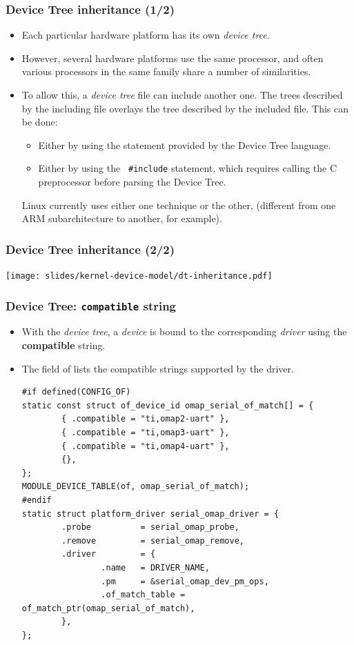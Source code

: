 \begin{frame}
  \frametitle{Device Tree inheritance (1/2)}
  \begin{itemize}
  \item Each particular hardware platform has its own {\em device tree}.
  \item However, several hardware platforms use the same processor,
    and often various processors in the same family share a number of
    similarities.
  \item To allow this, a {\em device tree} file can include another
    one. The trees described by the including file overlays the tree
    described by the included file. This can be done:
    \begin{itemize}
       \item Either by using the  statement
         provided by the Device Tree language.
       \item Either by using the {\tt
         \#include} statement, which requires calling the C
         preprocessor before parsing the Device Tree.
    \end{itemize}
    Linux currently uses either one technique or the other,
    (different from one ARM subarchitecture to another, for example).
  \end{itemize}
\end{frame}

\begin{frame}
  \frametitle{Device Tree inheritance (2/2)}
  \begin{center}
    \texttt{[image: slides/kernel-device-model/dt-inheritance.pdf]}
  \end{center}
\end{frame}

\begin{frame}[fragile]
  \frametitle{Device Tree: {\tt compatible} string}
  \begin{itemize}
  \item With the {\em device tree}, a {\em device} is bound to the
    corresponding {\em driver} using the {\bf compatible} string.
  \item The  field of 
    lists the compatible strings supported by the driver.
    \begin{block}{}
  \begin{verbatim}
#if defined(CONFIG_OF)
static const struct of_device_id omap_serial_of_match[] = {
        { .compatible = "ti,omap2-uart" },
        { .compatible = "ti,omap3-uart" },
        { .compatible = "ti,omap4-uart" },
        {},
};
MODULE_DEVICE_TABLE(of, omap_serial_of_match);
#endif
static struct platform_driver serial_omap_driver = {
        .probe          = serial_omap_probe,
        .remove         = serial_omap_remove,
        .driver         = {
                .name   = DRIVER_NAME,
                .pm     = &serial_omap_dev_pm_ops,
                .of_match_table = of_match_ptr(omap_serial_of_match),
        },
};
\end{verbatim}
\end{block}
  \end{itemize}
\end{frame}

